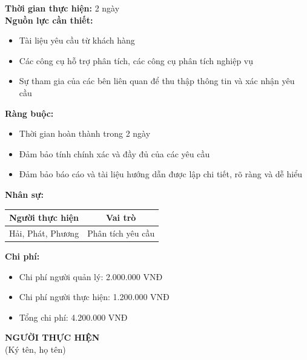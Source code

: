 {\begin{minipage}{\textwidth}
\begin{itemize}
\begin{itemize}
        \end{itemize}
    \end{itemize}
    \vspace{0.5cm}
    \noindent \textbf{Thời gian thực hiện:} 2 ngày \\
    \noindent \textbf{Nguồn lực cần thiết:}
    \begin{itemize}
        \item Tài liệu yêu cầu từ khách hàng
        \item Các công cụ hỗ trợ phân tích, các công cụ phân tích nghiệp vụ
        \item Sự tham gia của các bên liên quan để thu thập thông tin và xác nhận yêu cầu
    \end{itemize}
    \vspace{0.5cm}
    \noindent \textbf{Ràng buộc:}
    \begin{itemize}
        \item Thời gian hoàn thành trong 2 ngày
        \item Đảm bảo tính chính xác và đầy đủ của các yêu cầu
        \item Đảm bảo báo cáo và tài liệu hướng dẫn được lập chi tiết, rõ ràng và dễ hiểu
    \end{itemize}
    \vspace{0.5cm}
    \noindent \textbf{Nhân sự:}
    \begin{longtable}{|c|c|}
    \hline
    \textbf{Người thực hiện} & \textbf{Vai trò} \\
    \hline
    Hải, Phát, Phương & Phân tích yêu cầu \\
    \hline
    \end{longtable}
    \vspace{0.5cm}
    \noindent \textbf{Chi phí:}
    \begin{itemize}
        \item Chi phí người quản lý: 2.000.000 VNĐ
        \item Chi phí người thực hiện: 1.200.000 VNĐ
        \item Tổng chi phí: 4.200.000 VNĐ
    \end{itemize}
    \vspace{1cm}
    \begin{flushleft}
        \hspace{8cm} \textbf{NGƯỜI THỰC HIỆN} \\
        \hspace{8.8cm} (Ký tên, họ tên) \\
        \vspace{1cm}
    \end{flushleft}
    \end{minipage}
}
% 
